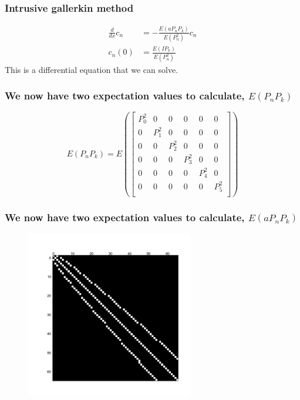 \documentclass{beamer}
\begin{document}
\begin{frame}
 \frametitle{Intrusive gallerkin method}
 \begin{align*}
 \frac{d}{dx}c_n &= -\frac{E(aP_nP_k)}{E(P_n^2)}c_n\\
 c_n(0) &= \frac{E(IP_k)}{E(P_n^2)}
 \end{align*}
 This is a differential equation that we can solve.

 \end{frame}

 
\begin{frame}
 \frametitle{We now have two expectation values to calculate, $E(P_nP_k)$}
\[E(P_nP_k) = E \left(\left[\begin{matrix}
               P_0^2 &0&0&0&0&0 \\
               0& P_1^2 &0&0&0&0\\
               0&0& P_2^2 &0&0&0\\
               0&0&0& P_3^2 &0&0\\
	       0&0&0&0& P_4^2 &0\\
               0&0&0&0&0& P_5^2\\
               \end{matrix}\right]\right)
\]
 
 \end{frame}


\begin{frame}
 \frametitle{We now have two expectation values to calculate, $E(aP_nP_k)$}
  \begin{figure}
  \includegraphics[width=0.65\textwidth]{binary_matrix.png}
 \end{figure}
 \end{frame}

 
\end{document}
